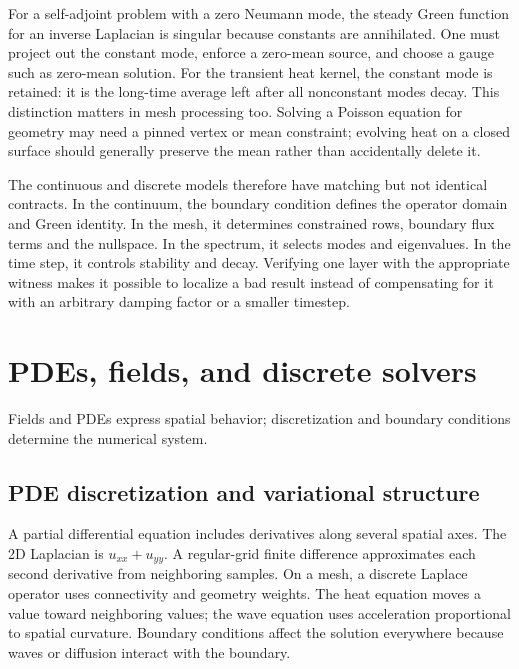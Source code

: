 For a self-adjoint problem with a zero Neumann mode, the steady Green function for an inverse Laplacian is singular because constants are annihilated. One must project out the constant mode, enforce a zero-mean source, and choose a gauge such as zero-mean solution. For the transient heat kernel, the constant mode is retained: it is the long-time average left after all nonconstant modes decay. This distinction matters in mesh processing too. Solving a Poisson equation for geometry may need a pinned vertex or mean constraint; evolving heat on a closed surface should generally preserve the mean rather than accidentally delete it.

The continuous and discrete models therefore have matching but not identical contracts. In the continuum, the boundary condition defines the operator domain and Green identity. In the mesh, it determines constrained rows, boundary flux terms and the nullspace. In the spectrum, it selects modes and eigenvalues. In the time step, it controls stability and decay. Verifying one layer with the appropriate witness makes it possible to localize a bad result instead of compensating for it with an arbitrary damping factor or a smaller timestep.

\section{PDEs, fields, and discrete solvers}\label{04-visual-computing-ii-ch030-pdes-fields-and-discrete-solvers}

\hypertarget{04-visual-computing-ii-ch030-pdes-fields-and-discrete-solvers}{}

Fields and PDEs express spatial behavior; discretization and boundary conditions determine the numerical system.

\subsection{PDE discretization and variational structure}\label{04-visual-computing-ii-ch030-pde-discretization-and-variational-structure}

\hypertarget{04-visual-computing-ii-ch030-pde-discretization-and-variational-structure}{}

A partial differential equation includes derivatives along several spatial axes. The 2D Laplacian is \(u_{xx}+u_{yy}\). A regular-grid finite difference approximates each second derivative from neighboring samples. On a mesh, a discrete Laplace operator uses connectivity and geometry weights. The heat equation moves a value toward neighboring values; the wave equation uses acceleration proportional to spatial curvature. Boundary conditions affect the solution everywhere because waves or diffusion interact with the boundary.

